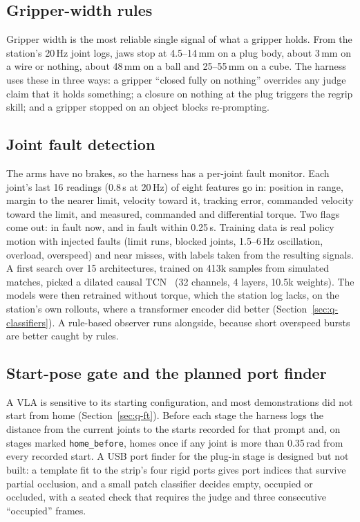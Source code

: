 \documentclass[10pt]{article}
\begin{document}
\subsection{Gripper-width rules}
Gripper width is the most reliable single signal of what a gripper holds. From the station's 20\,Hz joint logs, jaws stop at
4.5--14\,mm on a plug body, about 3\,mm on a wire or nothing, about 48\,mm on a ball and 25--55\,mm on a cube. The harness uses these
in three ways: a gripper ``closed fully on nothing'' overrides any judge claim that it holds something; a closure on nothing at the
plug triggers the regrip skill; and a gripper stopped on an object blocks re-prompting.

\subsection{Joint fault detection}
The arms have no brakes, so the harness has a per-joint fault monitor. Each joint's last 16 readings (0.8\,s at 20\,Hz) of eight features
go in: position in range, margin to the nearer limit, velocity toward it, tracking error, commanded velocity toward the limit, and
measured, commanded and differential torque. Two flags come out: in fault now, and in fault within 0.25\,s. Training data is real
policy motion with injected faults (limit runs, blocked joints, 1.5--6\,Hz oscillation, overload, overspeed) and near misses, with
labels taken from the resulting signals. A first search over 15 architectures, trained on 413k samples from simulated matches, picked a
dilated causal TCN~\cite{bai2018tcn} (32 channels, 4 layers, 10.5k weights). The models were then retrained without torque, which the station
log lacks, on the station's own rollouts, where a transformer encoder did better (Section~\ref{sec:q-classifiers}). A rule-based
observer runs alongside, because short overspeed bursts are better caught by rules.

\subsection{Start-pose gate and the planned port finder}
A VLA is sensitive to its starting configuration, and most demonstrations did not start from home (Section~\ref{sec:q-ft}). Before
each stage the harness logs the distance from the current joints to the starts recorded for that prompt and, on stages marked
\texttt{home\_before}, homes once if any joint is more than 0.35\,rad from every recorded start. A USB port finder for the plug-in
stage is designed but not built: a template fit to the strip's four rigid ports gives port indices that survive partial occlusion,
and a small patch classifier decides empty, occupied or occluded, with a seated check that requires the judge and three consecutive
``occupied'' frames.
\end{document}
